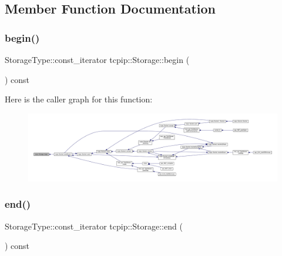 \subsection{Member Function Documentation}
\mbox{\label{classtcpip_1_1_storage_a0e6208feb041731abbdb595085f29394}} 
\subsubsection{\texorpdfstring{begin()}{begin()}}
{\footnotesize\ttfamily Storage\+Type\+::const\+\_\+iterator tcpip\+::\+Storage\+::begin (\begin{DoxyParamCaption}{ }\end{DoxyParamCaption}) const\hspace{0.3cm}{\ttfamily [inline]}}

Here is the caller graph for this function\+:\nopagebreak
\begin{figure}[H]
\begin{center}
\leavevmode
\includegraphics[width=350pt]{classtcpip_1_1_storage_a0e6208feb041731abbdb595085f29394_icgraph}
\end{center}
\end{figure}
\mbox{\label{classtcpip_1_1_storage_a42a2fec87e26a5a90f56e3d8201559e1}} 
\subsubsection{\texorpdfstring{end()}{end()}}
{\footnotesize\ttfamily Storage\+Type\+::const\+\_\+iterator tcpip\+::\+Storage\+::end (\begin{DoxyParamCaption}{ }\end{DoxyParamCaption}) const\hspace{0.3cm}{\ttfamily [inline]}}


